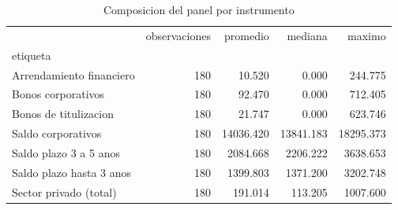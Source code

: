 \begin{table}
\caption{Composicion del panel por instrumento}
\label{tab:tabla2_por_instrumento}
\begin{tabular}{lrrrr}
\toprule
 & observaciones & promedio & mediana & maximo \\
etiqueta &  &  &  &  \\
\midrule
Arrendamiento financiero & 180 & 10.520 & 0.000 & 244.775 \\
Bonos corporativos & 180 & 92.470 & 0.000 & 712.405 \\
Bonos de titulizacion & 180 & 21.747 & 0.000 & 623.746 \\
Saldo corporativos & 180 & 14036.420 & 13841.183 & 18295.373 \\
Saldo plazo 3 a 5 anos & 180 & 2084.668 & 2206.222 & 3638.653 \\
Saldo plazo hasta 3 anos & 180 & 1399.803 & 1371.200 & 3202.748 \\
Sector privado (total) & 180 & 191.014 & 113.205 & 1007.600 \\
\bottomrule
\end{tabular}
\end{table}
